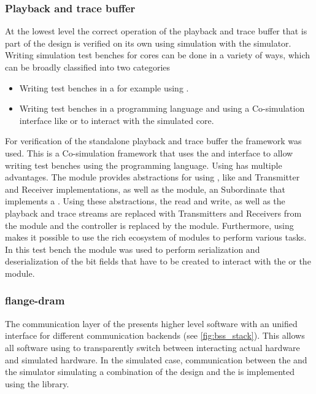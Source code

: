\subsubsection{Playback and trace buffer}
At the lowest level the correct operation of the playback and trace buffer that is part of the \FPGA{} design is verified on its own using simulation with the \xcelium{} simulator.
Writing simulation test benches for \FPGA{} cores can be done in a variety of ways, which can be broadly classified into two categories
\begin{itemize}
    \item Writing test benches in a \hdl{} for example using \uvmframework{}\autocite{ref:uvm}.
    \item Writing test benches in a programming language and using a Co-simulation interface like \VPI{}\autocite{ref:vpi} or \DPI{}\autocite{ref:dpi} to interact with the simulated \FPGA{} core.
\end{itemize}
For verification of the standalone playback and trace buffer the \cocotb{} framework was used. This is a Co-simulation framework that uses the \VPI{} and \VHPI{}\autocite{ref:vhpi} interface to allow writing test benches using the \python{} programming language. Using \cocotb{} has multiple advantages. The \cocotbaxi{} module provides abstractions for using \AXI{}, like \AXI{} and \AXIStream{} Transmitter and Receiver implementations, as well as the \AXIRAM{} module, an \AXI{} Subordinate that implements a \RAM{}. Using these abstractions, the \HostARQ{} read and write, as well as the playback and trace streams are replaced with \AXIStream{} Transmitters and Receivers from the \cocotbaxi{} module and the \AXI{} \DRAM{} controller is replaced by the \AXIRAM{} module.
Furthermore, using \python{} makes it possible to use the rich ecosystem of \python{} modules to perform various tasks. In this test bench the \construct{}\autocite{ref:construct} module was used to perform serialization and deserialization of the bit fields that have to be created to interact with the \FAXI{} or the \AXIDMA{} module.

\subsubsection{flange-dram}
The communication layer of the \bssTwoOS{} presents higher level software with an unified interface for different communication backends (see \autoref{fig:bss_stack}). This allows all software using \hxcomm{} to transparently switch between interacting actual hardware and simulated hardware. In the simulated case, communication between the \hxcomm{} and the simulator simulating a combination of the \FPGA{} design and the \ASIC{} is implemented using the \flange{} library\autocite{ref:flange}.

